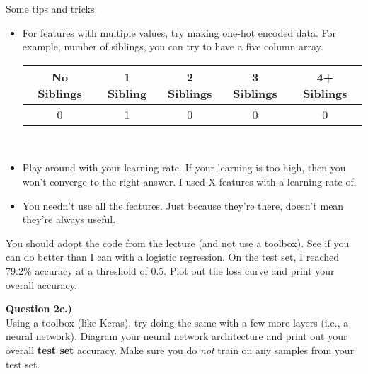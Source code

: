 \documentclass[paper=a4, fontsize=11pt]{scrartcl} %
\begin{document}
Some tips and tricks:

\begin{itemize}
    \item For features with multiple values, try making one-hot encoded data. For example, number of siblings, you can try to have a five column array. \\
    
    \begin{tabular}{|c|c|c|c|c|}
        \hline
         No Siblings & 1 Sibling & 2 Siblings & 3 Siblings & 4+ Siblings  \\
         \hline
                0    &    1      &      0     &       0  &    0\\
        \hline
    \end{tabular} \\
    \item Play around with your learning rate. If your learning is too high, then you won't converge to the right answer. I used X features with a learning rate of.
    \item You needn't use all the features. Just because they're there, doesn't mean they're always useful.
\end{itemize}

You should adopt the code from the lecture (and not use a toolbox). See if you can do better than I can with a logistic regression. On the test set, I reached 79.2\% accuracy at a threshold of 0.5. Plot out the loss curve and print your overall accuracy.

\vspace{1cm}
{\Large \textbf{Question 2c.)}} \\

Using a toolbox (like Keras), try doing the same with a few more layers (i.e., a neural network). Diagram your neural network architecture and print out your overall \textbf{test set} accuracy. Make sure you do \emph{not} train on any samples from your test set.
\end{document}

